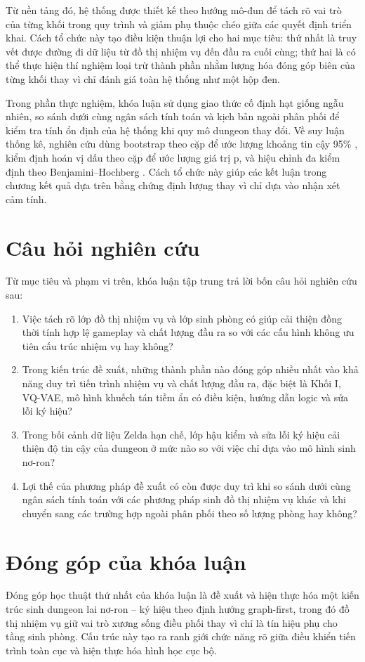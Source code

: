 \documentclass[oneside,a4paper,12pt]{extreport}
\begin{document}
Từ nền tảng đó, hệ thống được thiết kế theo hướng mô-đun để tách rõ vai trò của từng khối trong quy trình và giảm phụ thuộc chéo giữa các quyết định triển khai. Cách tổ chức này tạo điều kiện thuận lợi cho hai mục tiêu: thứ nhất là truy vết được đường đi dữ liệu từ đồ thị nhiệm vụ đến đầu ra cuối cùng; thứ hai là có thể thực hiện thí nghiệm loại trừ thành phần nhằm lượng hóa đóng góp biên của từng khối thay vì chỉ đánh giá toàn hệ thống như một hộp đen.

Trong phần thực nghiệm, khóa luận sử dụng giao thức cố định hạt giống ngẫu nhiên, so sánh dưới cùng ngân sách tính toán và kịch bản ngoài phân phối để kiểm tra tính ổn định của hệ thống khi quy mô dungeon thay đổi. Về suy luận thống kê, nghiên cứu dùng bootstrap theo cặp để ước lượng khoảng tin cậy 95\% \cite{efron1994bootstrap}, kiểm định hoán vị dấu theo cặp để ước lượng giá trị p, và hiệu chỉnh đa kiểm định theo Benjamini--Hochberg \cite{benjamini1995fdr}. Cách tổ chức này giúp các kết luận trong chương kết quả dựa trên bằng chứng định lượng thay vì chỉ dựa vào nhận xét cảm tính.

\section{Câu hỏi nghiên cứu}
Từ mục tiêu và phạm vi trên, khóa luận tập trung trả lời bốn câu hỏi nghiên cứu sau:
\begin{enumerate}[label=(RQ\arabic*)]
  \item Việc tách rõ lớp đồ thị nhiệm vụ và lớp sinh phòng có giúp cải thiện đồng thời tính hợp lệ gameplay và chất lượng đầu ra so với các cấu hình không ưu tiên cấu trúc nhiệm vụ hay không?
  \item Trong kiến trúc đề xuất, những thành phần nào đóng góp nhiều nhất vào khả năng duy trì tiến trình nhiệm vụ và chất lượng đầu ra, đặc biệt là Khối I, VQ-VAE, mô hình khuếch tán tiềm ẩn có điều kiện, hướng dẫn logic và sửa lỗi ký hiệu?
  \item Trong bối cảnh dữ liệu Zelda hạn chế, lớp hậu kiểm và sửa lỗi ký hiệu cải thiện độ tin cậy của dungeon ở mức nào so với việc chỉ dựa vào mô hình sinh nơ-ron?
  \item Lợi thế của phương pháp đề xuất có còn được duy trì khi so sánh dưới cùng ngân sách tính toán với các phương pháp sinh đồ thị nhiệm vụ khác và khi chuyển sang các trường hợp ngoài phân phối theo số lượng phòng hay không?
\end{enumerate}

\section{Đóng góp của khóa luận}
Đóng góp học thuật thứ nhất của khóa luận là đề xuất và hiện thực hóa một kiến trúc sinh dungeon lai nơ-ron -- ký hiệu theo định hướng graph-first, trong đó đồ thị nhiệm vụ giữ vai trò xương sống điều phối thay vì chỉ là tín hiệu phụ cho tầng sinh phòng. Cấu trúc này tạo ra ranh giới chức năng rõ giữa điều khiển tiến trình toàn cục và hiện thực hóa hình học cục bộ.
\end{document}
